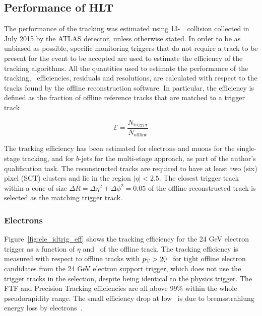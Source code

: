 



		\subsection{Performance of HLT}
		\label{sec:Trig_perf}

			The performance of the tracking was estimated using 13-\TeV\ \pp\ collision collected in July 2015 by the \ac{ATLAS} detector, unless otherwise stated. In order to be as unbiased as possible, specific monitoring triggers that do not require a track to be present for the event to be accepted are used to estimate the efficiency of the tracking algorithms. All the quantities used to estimate the performance of the tracking, \ie\ efficiencies, residuals and resolutions, are calculated with respect to the tracks found by the offline reconstruction software. In particular, the efficiency is defined as the fraction of offline reference tracks that are matched to a trigger track 

			\begin{equation}
				\mathcal{E} = \frac{N_{\mathrm{trigger}}}{N_{\mathrm{offline}}}
				\label{eq:trig_eff}
			\end{equation}

			The tracking efficiency has been estimated for electrons and muons for the single-stage tracking, and for $b$-jets for the multi-stage approach, as part of the author's qualification task. The reconstructed tracks are required to have at least two (six) pixel (SCT) clusters and lie in the region $\left | \eta \right | < 2.5$. The closest trigger track within a cone of size $\Delta R =  \Delta \eta^2 + \Delta \phi^2 = 0.05$ of the offline reconstructed track is selected as the matching trigger track.


			\subsubsection*{Electrons}

				Figure~\ref{fig:ele_idtrig_eff} shows the tracking efficiency for the 24 GeV electron trigger as a function of $\eta$ and \pt\ of the offline track. The tracking efficiency is measured with respect to offline tracks with $p_{\mathrm{T}} > 20$ \GeV\ for tight offline electron candidates from the 24 GeV electron support trigger, which does not use the trigger tracks in the selection, despite being identical to the physics trigger. The FTF and Precision Tracking efficiencies are all above 99\% within the whole pseudorapidity range. The small efficiency drop at low \pt\ is due to bremsstrahlung energy loss by electrons~\cite{ATLASTrigger2015}.

